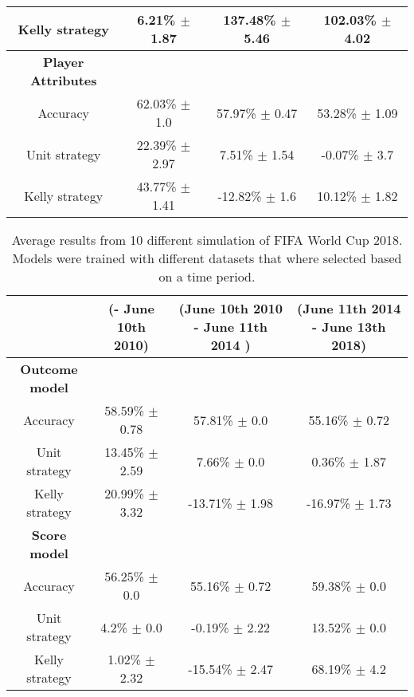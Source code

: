 \begin{table}
\begin{tabular}{ | c |c| c | c |}
    Kelly strategy & 6.21\% $\pm$ 1.87 & 137.48\% $\pm$ 5.46 & 102.03\% $\pm$ 4.02 \\
    \hline
    \textbf{Player Attributes} \\
    \hline
    Accuracy & 62.03\% $\pm$ 1.0 & 57.97\% $\pm$ 0.47 & 53.28\% $\pm$ 1.09 \\
    Unit strategy & 22.39\% $\pm$ 2.97 & 7.51\% $\pm$ 1.54 & -0.07\% $\pm$ 3.7 \\
    Kelly strategy & 43.77\% $\pm$ 1.41 & -12.82\% $\pm$ 1.6 & 10.12\% $\pm$ 1.82 \\
    \hline
   \end{tabular}
\end{table}

\begin{sidewaystable}
    \caption{Average results from 10 different simulation of FIFA World Cup 2018. Models were trained with different datasets that where selected based on a time period.}
    \begin{tabular}{ | c |c| c | c |}
    \hline
    & (- June 10th 2010) & (June 10th 2010 - June 11th 2014 ) & (June 11th 2014 - June 13th 2018) \\
    \hline
    \textbf{Outcome model} \\
    \hline
    Accuracy & 58.59\% $\pm$ 0.78 & 57.81\% $\pm$ 0.0 & 55.16\% $\pm$ 0.72 \\
    Unit strategy& 13.45\% $\pm$ 2.59 & 7.66\% $\pm$ 0.0 & 0.36\% $\pm$ 1.87 \\
    Kelly strategy& 20.99\% $\pm$ 3.32 & -13.71\% $\pm$ 1.98 & -16.97\% $\pm$ 1.73 \\
    \hline
    \textbf{Score model} \\
    \hline
    Accuracy & 56.25\% $\pm$ 0.0 & 55.16\% $\pm$ 0.72 & 59.38\% $\pm$ 0.0 \\
    Unit strategy & 4.2\% $\pm$ 0.0 & -0.19\% $\pm$ 2.22 & 13.52\% $\pm$ 0.0 \\
    Kelly strategy & 1.02\% $\pm$ 2.32 & -15.54\% $\pm$ 2.47 & 68.19\% $\pm$ 4.2 \\
    \hline
   \end{tabular}
\end{sidewaystable}


